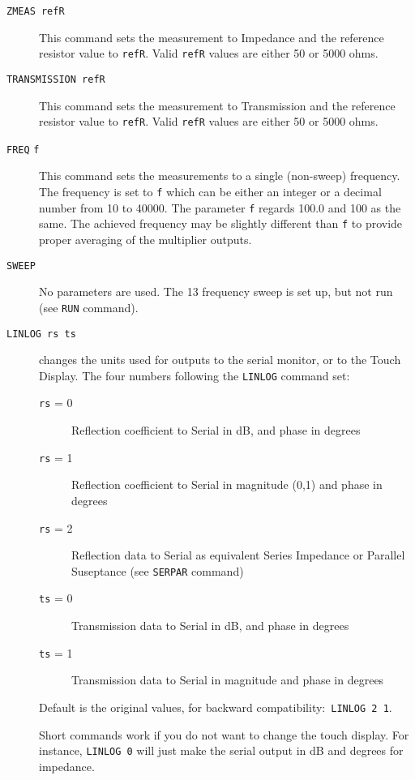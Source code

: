 \begin{description}

\item[\texttt{ZMEAS refR}]
This command sets the measurement to Impedance and the reference resistor value to \texttt{refR}.  Valid \texttt{refR} values are either 50 or 5000 ohms.

\item[\texttt{TRANSMISSION refR}]
This command sets the measurement to Transmission and the reference resistor value to \texttt{refR}.  Valid \texttt{refR} values are either 50 or 5000 ohms.

\item[\texttt{FREQ} \texttt{f}]
This command sets the measurements to a single (non-sweep) frequency. The frequency is set to \texttt{f} which can be either an integer or a decimal number from 10 to 40000.   The parameter \texttt{f} regards 100.0 and 100 as the same.  The achieved frequency may be slightly different than \texttt{f} to provide proper averaging of the multiplier outputs.

\item[\texttt{SWEEP}]   No parameters are used.  The 13 frequency sweep is set up, but not run (see \texttt{RUN} command).

\item[\texttt{LINLOG rs ts}]  changes the units used for outputs to the serial monitor,
  or to the Touch Display.  The four numbers following the \texttt{LINLOG} command set:
\begin{description}
\item[\texttt{rs} = 0]  Reflection coefficient to Serial in dB, and phase in degrees
\item[\texttt{rs} = 1]  Reflection coefficient to Serial in magnitude (0,1) and phase in degrees
\item[\texttt{rs} = 2]  Reflection data to Serial as equivalent Series Impedance or Parallel Suseptance (see \texttt{SERPAR} command)
\item[\texttt{ts} = 0]  Transmission data to Serial in dB, and phase in degrees
\item[\texttt{ts} = 1]  Transmission data to Serial in magnitude and phase in degrees
\end{description}
   Default is the original values, for backward compatibility:\mbox{ \texttt{LINLOG 2 1}.}

   Short commands work if you do not want to change the touch display. For instance, \texttt{LINLOG 0} will
   just make the serial output in dB and degrees for impedance.


\end{description}
